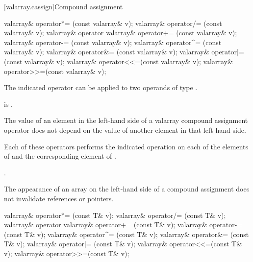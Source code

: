 [valarray.cassign]{Compound assignment}

%
%
%
%
%
%
%
%
%
%
\begin{itemdecl}
valarray& operator*= (const valarray& v);
valarray& operator/= (const valarray& v);
valarray& operator%
valarray& operator+= (const valarray& v);
valarray& operator-= (const valarray& v);
valarray& operator^= (const valarray& v);
valarray& operator&= (const valarray& v);
valarray& operator|= (const valarray& v);
valarray& operator<<=(const valarray& v);
valarray& operator>>=(const valarray& v);
\end{itemdecl}

\begin{itemdescr}
\pnum
\mandates
The indicated operator can be applied to two operands of type .

\pnum
\expects
{} is .

The value of an element in the left-hand side of a valarray compound
assignment operator does not depend on the value of another element in that left
hand side.

\pnum
\effects
Each of these operators
performs the indicated operation on each of the elements of  and the
corresponding element of .

\pnum
\returns
{}.

\pnum
\remarks
The appearance of an array on the left-hand side of a compound assignment
does not invalidate references or pointers.
\end{itemdescr}

%
%
%
%
%
%
%
%
%
%
\begin{itemdecl}
valarray& operator*= (const T& v);
valarray& operator/= (const T& v);
valarray& operator%
valarray& operator+= (const T& v);
valarray& operator-= (const T& v);
valarray& operator^= (const T& v);
valarray& operator&= (const T& v);
valarray& operator|= (const T& v);
valarray& operator<<=(const T& v);
valarray& operator>>=(const T& v);
\end{itemdecl}

